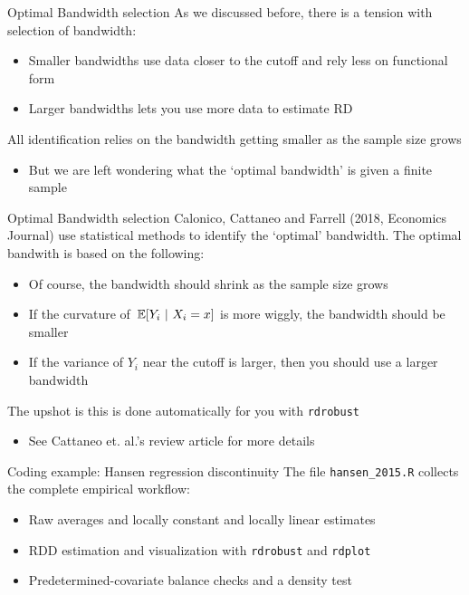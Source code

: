 \documentclass[aspectratio=169,t,11pt,table]{beamer}
\begin{document}
\begin{frame}{Optimal Bandwidth selection}
  As we discussed before, there is a tension with selection of bandwidth:
  \begin{itemize}
    \item Smaller bandwidths use data closer to the cutoff and rely less on functional form
    
    \item Larger bandwidths lets you use more data to estimate RD
  \end{itemize}

  \bigskip
  All identification relies on the bandwidth getting smaller as the sample size grows
  \begin{itemize}
    \item But we are left wondering what the `optimal bandwidth' is given a finite sample
  \end{itemize}
\end{frame}


\begin{frame}{Optimal Bandwidth selection}
  Calonico, Cattaneo and Farrell (2018, Economics Journal) use statistical methods to identify the `optimal' bandwidth. The optimal bandwith is based on the following:
  \begin{itemize}
    \item Of course, the bandwidth should shrink as the sample size grows

    \item If the curvature of $\expec{Y_i}{X_i = x}$ is more wiggly, the bandwidth should be smaller

    \item If the variance of $Y_i$ near the cutoff is larger, then you should use a larger bandwidth
  \end{itemize}

  \pause
  \bigskip 
  The upshot is this is done automatically for you with \texttt{rdrobust}
  \begin{itemize}
    \item See Cattaneo et. al.'s review article for more details
  \end{itemize}
\end{frame}

\begin{frame}{Coding example: Hansen regression discontinuity}
  The file \texttt{hansen\_2015.R} collects the complete empirical workflow:
  \begin{itemize}
    \item Raw averages and locally constant and locally linear estimates
    \item RDD estimation and visualization with \texttt{rdrobust} and \texttt{rdplot}
    \item Predetermined-covariate balance checks and a density test
  \end{itemize}
\end{frame}
\end{document}
